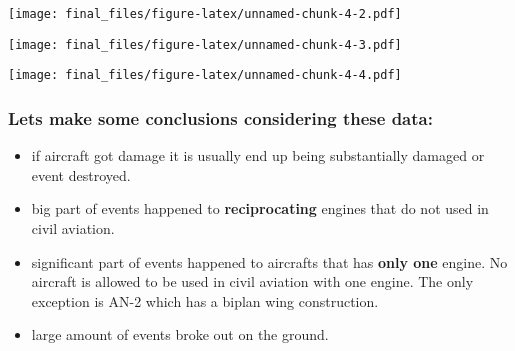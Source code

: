 \documentclass[]{article}
\newenvironment{Shaded}{\begin{snugshade}}{\end{snugshade}}
\newcommand{\KeywordTok}[1]{\textcolor[rgb]{0.13,0.29,0.53}{\textbf{#1}}}
\newcommand{\NormalTok}[1]{#1}
\newcommand{\OperatorTok}[1]{\textcolor[rgb]{0.81,0.36,0.00}{\textbf{#1}}}
\newcommand{\StringTok}[1]{\textcolor[rgb]{0.31,0.60,0.02}{#1}}
\providecommand{\tightlist}{%
  \setlength{\itemsep}{0pt}\setlength{\parskip}{0pt}}
\begin{document}
\texttt{[image: final\_files/figure-latex/unnamed-chunk-4-2.pdf]}

\begin{Shaded}
\end{Shaded}

\texttt{[image: final\_files/figure-latex/unnamed-chunk-4-3.pdf]}

\begin{Shaded}
\end{Shaded}

\texttt{[image: final\_files/figure-latex/unnamed-chunk-4-4.pdf]}

\hypertarget{lets-make-some-conclusions-considering-these-data}{%
\subsubsection{Lets make some conclusions considering these
data:}\label{lets-make-some-conclusions-considering-these-data}}

\begin{itemize}
\tightlist
\item
  if aircraft got damage it is usually end up being substantially
  damaged or event destroyed.
\item
  big part of events happened to \textbf{reciprocating} engines that do
  not used in civil aviation.
\item
  significant part of events happened to aircrafts that has \textbf{only
  one} engine. No aircraft is allowed to be used in civil aviation with
  one engine. The only exception is AN-2 which has a biplan wing
  construction.
\item
  large amount of events broke out on the ground.
\end{itemize}
\end{document}
